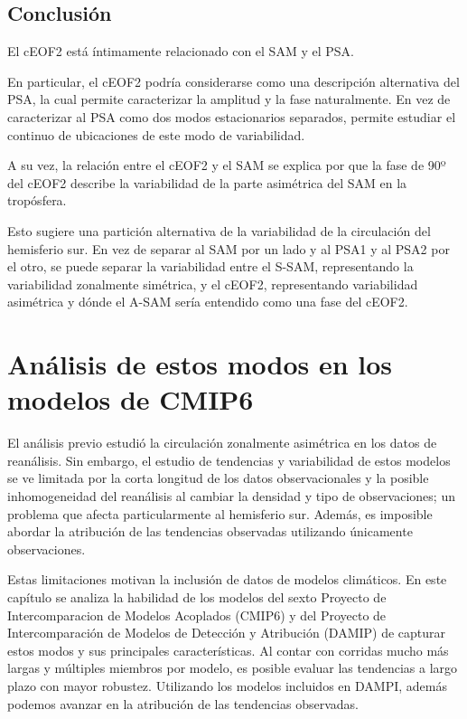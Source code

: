 \documentclass[12pt,oneside]{reedthesis}
\begin{document}
\hypertarget{conclusiuxf3n-1}{%
\section{Conclusión}\label{conclusiuxf3n-1}}

El cEOF2 está íntimamente relacionado con el SAM y el PSA.

En particular, el cEOF2 podría considerarse como una descripción alternativa del PSA, la cual permite caracterizar la amplitud y la fase naturalmente.
En vez de caracterizar al PSA como dos modos estacionarios separados, permite estudiar el continuo de ubicaciones de este modo de variabilidad.

A su vez, la relación entre el cEOF2 y el SAM se explica por que la fase de 90º del cEOF2 describe la variabilidad de la parte asimétrica del SAM en la tropósfera.

Esto sugiere una partición alternativa de la variabilidad de la circulación del hemisferio sur.
En vez de separar al SAM por un lado y al PSA1 y al PSA2 por el otro, se puede separar la variabilidad entre el S-SAM, representando la variabilidad zonalmente simétrica, y el cEOF2, representando variabilidad asimétrica y dónde el A-SAM sería entendido como una fase del cEOF2.

\hypertarget{anuxe1lisis-de-estos-modos-en-los-modelos-de-cmip6}{%
\chapter{Análisis de estos modos en los modelos de CMIP6}\label{anuxe1lisis-de-estos-modos-en-los-modelos-de-cmip6}}

El análisis previo estudió la circulación zonalmente asimétrica en los datos de reanálisis.
Sin embargo, el estudio de tendencias y variabilidad de estos modelos se ve limitada por la corta longitud de los datos observacionales y la posible inhomogeneidad del reanálisis al cambiar la densidad y tipo de observaciones; un problema que afecta particularmente al hemisferio sur.
Además, es imposible abordar la atribución de las tendencias observadas utilizando únicamente observaciones.

Estas limitaciones motivan la inclusión de datos de modelos climáticos.
En este capítulo se analiza la habilidad de los modelos del sexto Proyecto de Intercomparacion de Modelos Acoplados (CMIP6) y del Proyecto de Intercomparación de Modelos de Detección y Atribución (DAMIP) de capturar estos modos y sus principales características.
Al contar con corridas mucho más largas y múltiples miembros por modelo, es posible evaluar las tendencias a largo plazo con mayor robustez.
Utilizando los modelos incluidos en DAMPI, además podemos avanzar en la atribución de las tendencias observadas.
\end{document}
